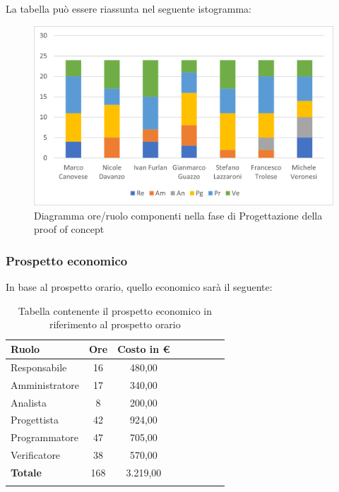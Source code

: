 La tabella può essere riassunta nel seguente istogramma:

\begin{figure}[H]
	\centering
	\includegraphics[width=0.8\linewidth]{res/images/preventivo/4-1.png}
	\caption{Diagramma ore/ruolo componenti nella fase di Progettazione della proof of concept}
	\label{fig:diagramma suddivisione ruoli fase progettazione della proof of concept}
\end{figure}

\subsubsection{Prospetto economico}
In base al prospetto orario, quello economico sarà il seguente:

\begin{longtable}{|l|c|c|c|c|c|c|c|}
	\hline
	\rowcolor{lighter-grayer}
	\textbf{Ruolo}  & \textbf{Ore} & \textbf{Costo in €} \\
	\hline
	\endfirsthead

	\hline
	Responsabile    & 16           & 480,00              \\
	\hline
	\hline
	Amministratore  & 17           & 340,00              \\
	\hline
	\hline
	Analista        & 8            & 200,00              \\
	\hline
	\hline
	Progettista     & 42           & 924,00              \\
	\hline
	\hline
	Programmatore   & 47           & 705,00              \\
	\hline
	\hline
	Verificatore    & 38           & 570,00              \\
	\hline
	\hline
	\textbf{Totale} & 168          & 3.219,00            \\
	\hline
	\rowcolor{white}
	\caption{Tabella contenente il prospetto economico in riferimento al prospetto orario}
\end{longtable}
\pagebreak

